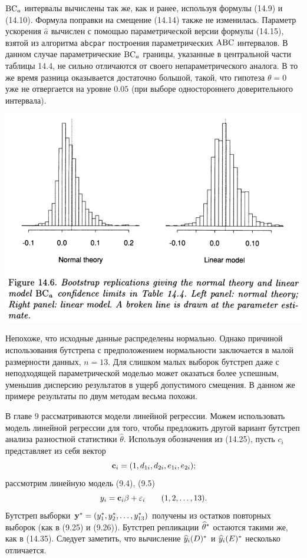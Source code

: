$\mathrm{BC}_a$ интервалы вычислены так же, как и ранее, используя формулы (14.9) и (14.10). Формула поправки на смещение (14.14) также не изменилась. Параметр ускорения $\hat a$ вычислен с помощью параметрической версии формулы (14.15), взятой из алгоритма \texttt{abcpar} построения параметрических $\mathrm{ABC}$ интервалов. В данном случае параметрические $\mathrm{BC}_a$ границы, указанные в центральной части таблицы 14.4, не сильно отличаются от своего непараметрического аналога. В то же время разница оказывается достаточно большой, такой, что гипотеза $\theta = 0$ уже не отвергается на уровне $0.05$ (при выборе одностороннего доверительного интервала).

\includegraphics[width=0.85\linewidth]{14/f146.png}
\newline

Непохоже, что исходные данные распределены нормально. Однако причиной использования бутстрепа с предположением нормальности заключается в малой размерности данных, $n=13$. Для слишком малых выборок бутстреп даже с неподходящей параметрической моделью может оказаться более успешным, уменьшив дисперсию результатов в ущерб допустимого смещения. В данном же примере результаты по двум методам весьма похожи.

В главе 9 рассматриваются модели линейной регрессии. Можем использовать модель линейной регрессии для того, чтобы предложить другой вариант бутстреп анализа разностной статистики $\hat \theta$. Используя обозначения из (14.25), пусть $c_i$ представляет из себя вектор
\begin{equation}
 \mathbf c_i = (1,d_{1i},d_{2i}, e_{1i}, e_{2i});
\end{equation}
рассмотрим линейную модель (9.4), (9.5)
\begin{equation}
  y_i = \mathbf c_i\mathbf \beta + \varepsilon_i \qquad (1,2,\ldots,13).
\end{equation}
Бутстреп выборки $\mathbf y^* = (y_1^*,y_2^*,\ldots,y_{13}^*)$ получены из остатков повторных выборок (как в (9.25) и (9.26)). Бутстреп репликации $\widehat{\theta}^*$ остаются такими же, как в (14.35). Следует заметить, что вычисление $\widehat{y}_i(D)^*$ и $\widehat{y}_i(E)^*$ несколько отличается.


